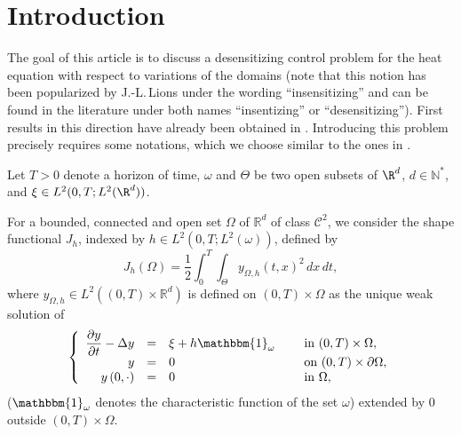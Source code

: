 \section{Introduction}

The goal of this article is to discuss a desensitizing control problem for the heat equation with respect to variations of the domains (note that this notion has been popularized by J.-L.\,Lions \cite{Lions-1990} under the wording ``insensitizing'' and can be found in the literature under both names ``insentizing'' or ``desensitizing''). First results in this direction have already been obtained in \cite{Lissy-Privat-Simpore}. Introducing this problem precisely requires some notations, which we choose similar to the ones in \cite{Lissy-Privat-Simpore}.

Let $T>0$ denote a horizon of time, $\omega$ and $\Theta$ be two open subsets of $\R^d$, $d\in\mathbb N^*$, and $\xi \in L^2(0,T; L^2(\R^d))$.

For a bounded, connected and open set $\Omega$ of $\mathbb{R}^d$ of class $\mathscr{C}^2$, we consider the shape functional $J_h$, indexed by $h \in L^2(0,T; L^2(\omega))$, defined by
\begin{equation}
\label{def-J}
J_h(\Omega) = \dfrac{1}{2}\int_{0}^{T} \int_{\Theta}y_{\Omega,h}(t,x)^{2}\, dx\,dt,
\end{equation}
where $y_{\Omega,h}\in L^2((0,T)\times \mathbb R^d)$ is defined on $(0,T)\times\Omega$ as the unique weak solution of
\begin{equation}
\label{y-Omega-h}
\left\{
\begin{array}{rcll}
\dfrac{\partial y}{\partial t}-\Delta y &=&\xi +h\mathbbm{1}_{\omega}\quad&\text{ in }(0,T) \times \Omega,
\\
y&=& 0 &\text{ on }(0,T) \times \partial \Omega,
\\
y\left(0,\cdot\right) &=& 0 &\text{ in }\Omega,
\end{array}
\right.
\end{equation}
($\mathbbm{1}_\omega$ denotes the characteristic function of the set $\omega$) extended by $0$ outside $(0,T) \times \Omega$.

